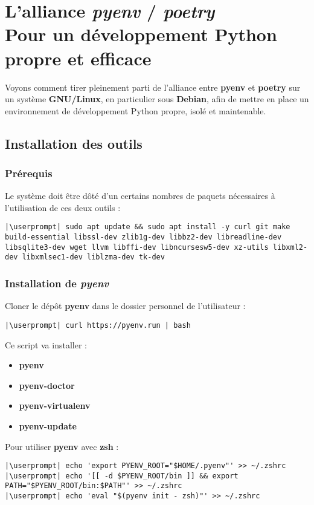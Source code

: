 \chapter[L'alliance \textit{pyenv} / \textit{poetry}]{L'alliance \textit{pyenv} / \textit{poetry}\\ Pour un développement Python \\ propre et efficace}

Voyons comment tirer pleinement parti de l’alliance entre \textbf{pyenv} et \textbf{poetry} sur un système \textbf{GNU/Linux}, en particulier sous \textbf{Debian}, afin de mettre en place un environnement de développement Python propre, isolé et maintenable.

\section*{Installation des outils}
\subsection*{Prérequis}
Le système doit être dôté d'un certains nombres de paquets nécessaires à l'utilisation de ces deux outils :
\begin{lstlisting}[style=bash]
|\userprompt| sudo apt update && sudo apt install -y curl git make build-essential libssl-dev zlib1g-dev libbz2-dev libreadline-dev libsqlite3-dev wget llvm libffi-dev libncursesw5-dev xz-utils libxml2-dev libxmlsec1-dev liblzma-dev tk-dev
\end{lstlisting}

\subsection*{Installation de \textit{pyenv}}
Cloner le dépôt \textbf{pyenv} dans le dossier personnel de l'utilisateur :
\begin{lstlisting}[style=bash]
|\userprompt| curl https://pyenv.run | bash
\end{lstlisting}

Ce script va installer :
\begin{itemize}
    \item \textbf{pyenv}
    \item \textbf{pyenv-doctor}
    \item \textbf{pyenv-virtualenv}
    \item \textbf{pyenv-update}
\end{itemize}
\medskip

Pour utiliser \textbf{pyenv} avec \textbf{zsh} :
\begin{lstlisting}[style=bash]
|\userprompt| echo 'export PYENV_ROOT="$HOME/.pyenv"' >> ~/.zshrc
|\userprompt| echo '[[ -d $PYENV_ROOT/bin ]] && export PATH="$PYENV_ROOT/bin:$PATH"' >> ~/.zshrc
|\userprompt| echo 'eval "$(pyenv init - zsh)"' >> ~/.zshrc 
\end{lstlisting}

